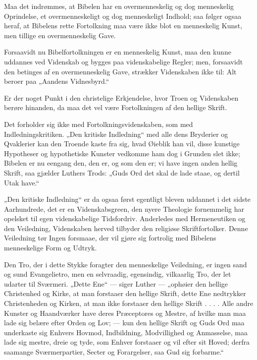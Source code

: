 \documentclass[12pt,a4paper]{book}
\newcommand{\opage}[1]{\marginnote{\footnotesize\textit{[#1]}}}
\begin{document}
Maa det indrømmes, at Bibelen har en overmenneskelig og dog menneskelig
Oprindelse, et overmenneskeligt og dog menneskeligt Indhold; saa følger
ogsaa heraf, at Bibelens rette Fortolkning maa være ikke blot en
menneskelig Kunst, men tillige en overmenneskelig Gave.

Forsaavidt nu Bibelfortolkningen er en menneskelig Kunst, maa den kunne
uddannes ved Videnskab og bygges paa videnskabelige Regler; men,
forsaavidt den betinges af en overmenneskelig Gave, strækker Videnskaben
ikke til: Alt beroer paa „Aandens Vidnesbyrd.“

Er der noget Punkt i den christelige Erkjendelse, hvor Troen og
Videnskaben berøre hinanden, da maa det vel være Fortolkningen af den
hellige Skrift.

Det forholder sig ikke med Fortolkningsvidenskaben, som med
Indledningskritiken. „Den kritiske Indledning“ med alle dens Bryderier og
Qvaklerier kan den Troende kaste fra sig, hvad Øieblik han vil, disse
kunstige Hypotheser og hypothetiske Kunster
\opage{54} vedkomme ham dog i Grunden slet ikke; Bibelen er nu eengang den, den er,
og som den er; vi have ingen anden hellig Skrift, saa gjælder Luthers
Trods: „Guds Ord det skal de lade staae, og dertil Utak have.“

„Den kritiske Indledning“ er da ogsaa først egentligt bleven uddannet i
det sidste Aarhundrede, det er en Videnskabsgreen, den nyere Theologie
fornemmelig har opelsket til egen videnskabelige Tidsfordriv. Anderledes
med Hermeneutiken og den Veiledning, Videnskaben herved tilbyder den
religiøse Skriftfortolker. Denne Veiledning tør Ingen forsmaae, der vil
gjøre sig fortrolig med Bibelens menneskelige Form og Udtryk.

Den Tro, der i dette Stykke foragter den menneskelige Veiledning, er
ingen sand og sund Evangelietro, men en selvraadig, egensindig,
vilkaarlig Tro, der let udarter til Sværmeri. „Dette Ene“ --- siger
Luther --- „ophøier den hellige Christenhed og Kirke, at man forstaaer
den hellige Skrift, dette Ene nedtrykker Christenheden og Kirken, at man
ikke forstaaer den hellige Skrift . . . . Alle andre Kunster og
Haandværker have deres Præceptores og Mestre, af hvilke man maa lade sig
belære efter Orden og Lov; --- kun den hellige Skrift og Guds Ord maa
underkaste sig Enhvers Hovmod, Indbildning, Modvillighed og Anmasselse,
maa lade sig mestre, dreie og tyde, som Enhver forstaaer og vil efter sit
Hoved; derfra saamange Sværmerpartier, Secter og Forargelser, saa Gud sig
forbarme.“
\end{document}

